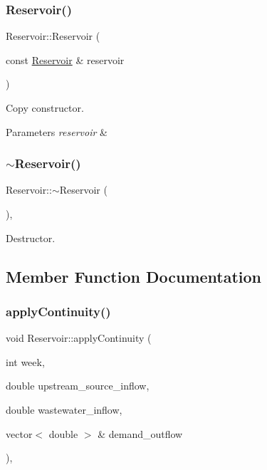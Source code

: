 \subsubsection{\texorpdfstring{Reservoir()}{Reservoir()}\hspace{0.1cm}{\footnotesize\ttfamily [9/9]}}
{\footnotesize\ttfamily Reservoir\+::\+Reservoir (\begin{DoxyParamCaption}\item[{const \mbox{\hyperlink{classReservoir}{Reservoir}} \&}]{reservoir }\end{DoxyParamCaption})}

Copy constructor. 
\begin{DoxyParams}{Parameters}
{\em reservoir} & \\
\hline
\end{DoxyParams}
\mbox{\label{classReservoir_a2f8bfdc73c7470185775a940fb3531de_a2f8bfdc73c7470185775a940fb3531de}} 
\subsubsection{\texorpdfstring{$\sim$\+Reservoir()}{~Reservoir()}}
{\footnotesize\ttfamily Reservoir\+::$\sim$\+Reservoir (\begin{DoxyParamCaption}{ }\end{DoxyParamCaption})\hspace{0.3cm}{\ttfamily [override]}, {\ttfamily [default]}}

Destructor. 

\subsection{Member Function Documentation}
\mbox{\label{classReservoir_a66929c055193785bc9d47bcdf0bc7445_a66929c055193785bc9d47bcdf0bc7445}} 
\subsubsection{\texorpdfstring{apply\+Continuity()}{applyContinuity()}}
{\footnotesize\ttfamily void Reservoir\+::apply\+Continuity (\begin{DoxyParamCaption}\item[{int}]{week,  }\item[{double}]{upstream\+\_\+source\+\_\+inflow,  }\item[{double}]{wastewater\+\_\+inflow,  }\item[{vector$<$ double $>$ \&}]{demand\+\_\+outflow }\end{DoxyParamCaption})\hspace{0.3cm}{\ttfamily [override]}, {\ttfamily [virtual]}}

